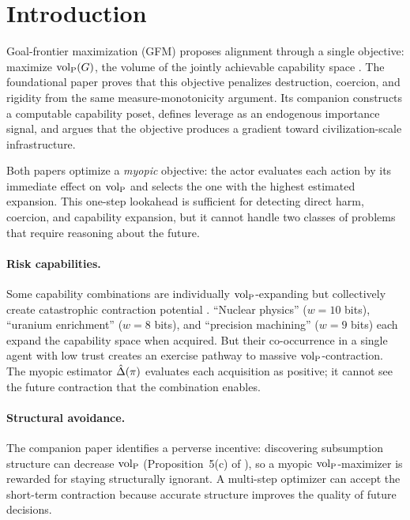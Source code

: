 \section{Introduction}
\label{sec:introduction}

Goal-frontier maximization (GFM) proposes alignment through a single
objective: maximize ${\operatorname{vol}_{\mathrm{P}}}(G)$, the volume of the jointly achievable
capability space \citep{lasser2026gfm}. The foundational paper proves that
this objective penalizes destruction, coercion, and rigidity from the same
measure-monotonicity argument. Its companion \citep{lasser2026poset}
constructs a computable capability poset, defines leverage as an endogenous
importance signal, and argues that the objective produces a gradient toward
civilization-scale infrastructure.

Both papers optimize a \emph{myopic} objective: the actor evaluates each
action by its immediate effect on ${\operatorname{vol}_{\mathrm{P}}}$ and selects the one with the
highest estimated expansion. This one-step lookahead is sufficient for
detecting direct harm, coercion, and capability expansion, but it cannot
handle two classes of problems that require reasoning about the future.

\paragraph{Risk capabilities.} Some capability combinations are individually
${\operatorname{vol}_{\mathrm{P}}}$-expanding but collectively create catastrophic contraction potential
\citep{bostrom2013existential, ord2020precipice}.
``Nuclear physics'' ($w = 10$ bits), ``uranium enrichment'' ($w = 8$ bits),
and ``precision machining'' ($w = 9$ bits) each expand the capability space
when acquired. But their co-occurrence in a single agent with low trust
creates an exercise pathway to massive ${\operatorname{vol}_{\mathrm{P}}}$-contraction. The myopic
estimator $\hat{\Delta}(\pi)$ evaluates each acquisition as positive; it cannot
see the future contraction that the combination enables.

\paragraph{Structural avoidance.} The companion paper identifies a perverse
incentive: discovering subsumption structure can decrease ${\operatorname{vol}_{\mathrm{P}}}$
(Proposition~5(c) of \citet{lasser2026poset}), so a myopic ${\operatorname{vol}_{\mathrm{P}}}$-maximizer
is rewarded for staying structurally ignorant. A multi-step optimizer can
accept the short-term contraction because accurate structure improves the
quality of future decisions.

